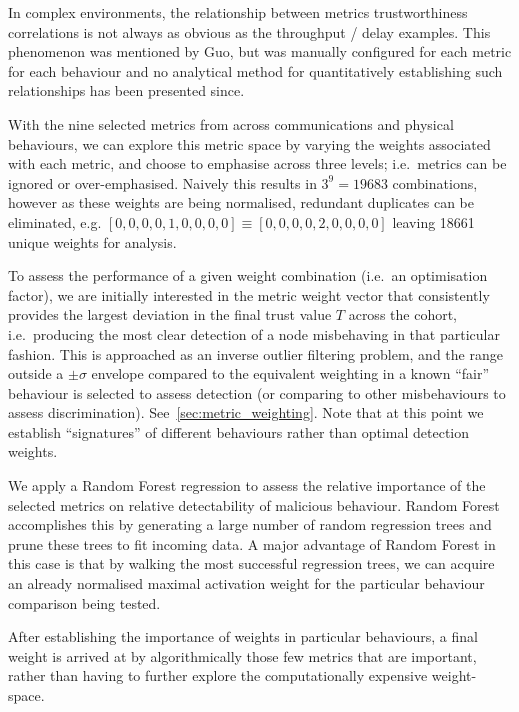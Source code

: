 In complex environments, the relationship between metrics trustworthiness correlations is not always as obvious as the throughput / delay examples.
This phenomenon was mentioned by Guo\cite{Guo2012}, but was manually configured for each metric for each behaviour and no analytical method for quantitatively establishing such relationships has been presented since.

With the nine selected metrics from across communications and physical behaviours, we can explore this metric space by varying the weights associated with each metric, and choose to emphasise across three levels; i.e.\ metrics can be ignored or over-emphasised. Naively this results in $3^9 = 19683$ combinations, however as these weights are being normalised, redundant duplicates can be eliminated, e.g. $[0,0,0,0,1,0,0,0,0] \equiv [0,0,0,0,2,0,0,0,0]$ leaving 18661 unique weights for analysis.

To assess the performance of a given weight combination (i.e.\ an optimisation factor), we are initially interested in the metric weight vector that consistently provides the largest deviation in the final trust value $T$ across the cohort, i.e.\ producing the most clear detection of a node misbehaving in that particular fashion.
This is approached as an inverse outlier filtering problem, and the range outside a $\pm\sigma$ envelope compared to the equivalent weighting in a known ``fair'' behaviour is selected to assess detection (or comparing to other misbehaviours to assess discrimination).
See~\autoref{sec:metric_weighting}.
Note that at this point we establish ``signatures'' of different behaviours rather than optimal detection weights.

We apply a Random Forest regression \cite{Breiman2001} to assess the relative importance of the selected metrics on relative detectability of malicious behaviour. 
Random Forest accomplishes this by generating a large number of random regression trees and prune these trees to fit incoming data. A major advantage of Random Forest in this case is that by walking the most successful regression trees, we can acquire an already normalised maximal activation weight for the particular behaviour comparison being tested.

After establishing the importance of weights in particular behaviours, a final weight is arrived at by algorithmically those few metrics that are important, rather than having to further explore the computationally expensive weight-space.

